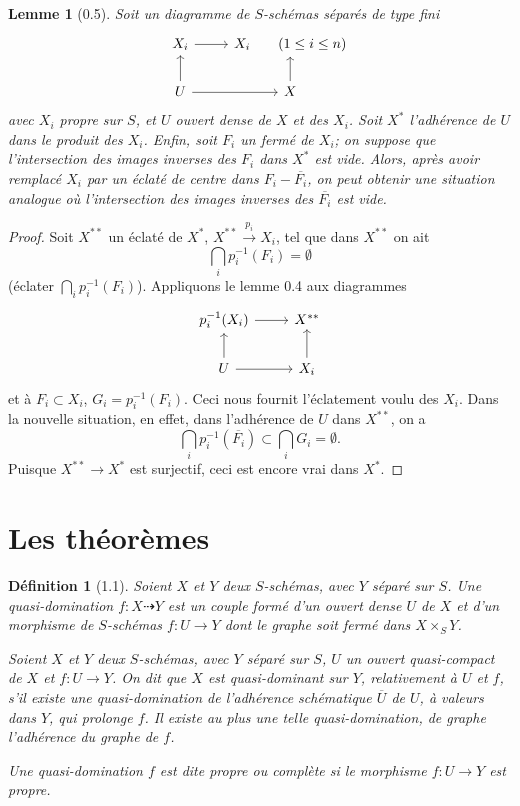 \documentclass[11pt]{article}
\newtheorem*{lemma}{Lemme}
\newtheorem*{definition}{Définition}
\begin{document}
\begin{lemma}[0.5]
Soit un diagramme de \(S\)-schémas séparés de type fini
\[
\begin{tikzcd}
X_i \ar[r] & X_i \qquad (1\le i\le n) \\
U \ar[u] \ar[r] & X \ar[u]
\end{tikzcd}
\]
avec \(X_i\) propre sur \(S\), et \(U\) ouvert dense de \(X\) et des \(X_i\). Soit \(X^*\) l'adhérence de \(U\) dans le produit des \(X_i\). Enfin, soit \(F_i\) un fermé de \(X_i\); on suppose que l'intersection des images inverses des \(F_i\) dans \(X^*\) est vide. Alors, après avoir remplacé \(X_i\) par un éclaté de centre dans \(F_i-\overline{F_i}\), on peut obtenir une situation analogue où l'intersection des images inverses des \(\overline{F_i}\) est vide.
\end{lemma}

\begin{proof}
Soit \(X^{**}\) un éclaté de \(X^*\), \(X^{**}\xrightarrow{p_i}X_i\), tel que dans \(X^{**}\) on ait
\[
\bigcap_i p_i^{-1}(F_i)=\emptyset
\]
(éclater \(\bigcap_i p_i^{-1}(F_i)\)). Appliquons le lemme 0.4 aux diagrammes
\[
\begin{tikzcd}
p_i^{-1}(X_i) \ar[r] & X^{**} \\
U \ar[u] \ar[r] & X_i \ar[u]
\end{tikzcd}
\]
et à \(F_i\subset X_i\), \(G_i=p_i^{-1}(F_i)\). Ceci nous fournit l'éclatement voulu des \(X_i\). Dans la nouvelle situation, en effet, dans l'adhérence de \(U\) dans \(X^{**}\), on a
\[
\bigcap_i p_i^{-1}(\overline{F_i})\subset \bigcap_i G_i=\emptyset.
\]
Puisque \(X^{**}\to X^*\) est surjectif, ceci est encore vrai dans \(X^*\).
\end{proof}

\section{Les théorèmes}

\begin{definition}[1.1]
Soient \(X\) et \(Y\) deux \(S\)-schémas, avec \(Y\) séparé sur \(S\). Une quasi-domination \(f:X\dashrightarrow Y\) est un couple formé d'un ouvert dense \(U\) de \(X\) et d'un morphisme de \(S\)-schémas \(f:U\to Y\) dont le graphe soit fermé dans \(X\times_S Y\).

Soient \(X\) et \(Y\) deux \(S\)-schémas, avec \(Y\) séparé sur \(S\), \(U\) un ouvert quasi-compact de \(X\) et \(f:U\to Y\). On dit que \(X\) est quasi-dominant sur \(Y\), relativement à \(U\) et \(f\), s'il existe une quasi-domination de l'adhérence schématique \(\overline U\) de \(U\), à valeurs dans \(Y\), qui prolonge \(f\). Il existe au plus une telle quasi-domination, de graphe l'adhérence du graphe de \(f\).

Une quasi-domination \(f\) est dite propre ou complète si le morphisme \(f:U\to Y\) est propre.
\end{definition}
\end{document}
